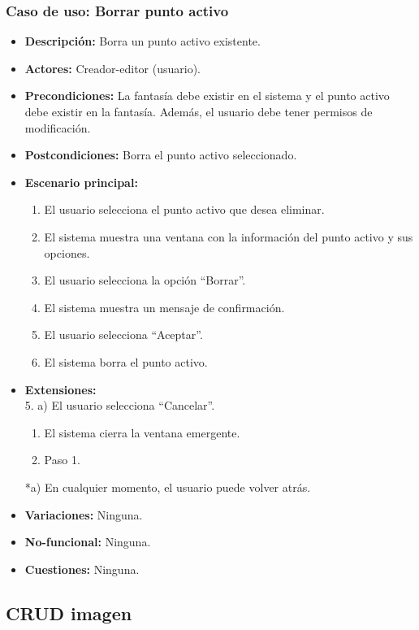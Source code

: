 \subsubsection{Caso de uso: Borrar punto activo}
\begin{itemize}
	\item \textbf{Descripción:} Borra un punto activo existente.
	\item \textbf{Actores:} Creador-editor (usuario).
	\item \textbf{Precondiciones:} La fantasía debe existir en el sistema y el punto activo debe existir en la fantasía. Además, el usuario debe tener permisos de modificación.
	\item \textbf{Postcondiciones:} Borra el punto activo seleccionado.
	\item \textbf{Escenario principal:}
	\begin{enumerate}
		\item El usuario selecciona el punto activo que desea eliminar.
		\item El sistema muestra una ventana con la información del punto activo y sus opciones.
		\item El usuario selecciona la opción ``Borrar''.
		\item El sistema muestra un mensaje de confirmación.
		\item El usuario selecciona ``Aceptar''.
		\item El sistema borra el punto activo.
	\end{enumerate}
	\item \textbf{Extensiones:} \\ 5. a) El usuario selecciona ``Cancelar''.
	\begin{enumerate}
		\item El sistema cierra la ventana emergente.
		\item Paso 1.
	\end{enumerate}
	*a) En cualquier momento, el usuario puede volver atrás.
	\item \textbf{Variaciones:} Ninguna.
	\item \textbf{No-funcional:} Ninguna.
	\item \textbf{Cuestiones:} Ninguna.
\end{itemize}

\subsection{CRUD imagen} %
\hypertarget{crearimagen}{}
